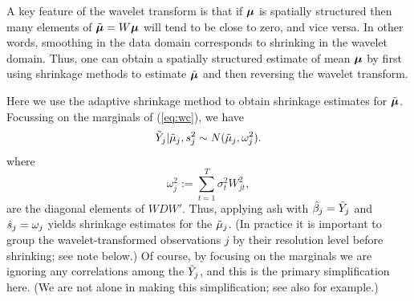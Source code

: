 \documentclass[12pt]{article}
\newcommand{\s}{\sigma}
\begin{document}
A key feature of the wavelet transform is that if $\bm{\mu}$ is spatially structured 
then many elements of $\tilde{\bm{\mu}}=W\bm{\mu}$ will tend to be close to zero, and vice versa.
In other words, smoothing in the data domain corresponds to shrinking in the wavelet domain.
Thus, one can obtain a spatially structured estimate of
mean $\bm{\mu}$ by first using shrinkage methods to estimate $\tilde{\bm{\mu}}$ and then
reversing the wavelet transform. 


Here we use the adaptive shrinkage method to obtain shrinkage estimates for $\tilde{\bm{\mu}}$.
Focussing on the marginals of (\ref{eq:wc}), we have
\begin{equation} \label{eq:normlik}
\tilde{Y}_j | \tilde\mu_j, s^2_j \sim N(\tilde\mu_j, \omega^2_j).
\end{equation}
where
\begin{equation}
\omega^2_j:=\sum_{t=1}^T \s^2_t W_{jt}^2,
\end{equation}
are the diagonal elements of $WDW'$.
Thus, applying ash with $\hat{\beta}_j = \tilde{Y}_j$ and $\hat{s}_j = \omega_j$ yields shrinkage estimates for the $\tilde\mu_j$.
(In practice it is important to group the wavelet-transformed observations $j$ 
by their resolution level before shrinking; see note below.)
Of course, by focusing on the marginals we are ignoring any correlations among the $\tilde{Y}_j$, and this
is the primary simplification here. (We are not alone in making this simplification;
see also \cite{Silverman1999Wavelets} for example.) 
\end{document}
